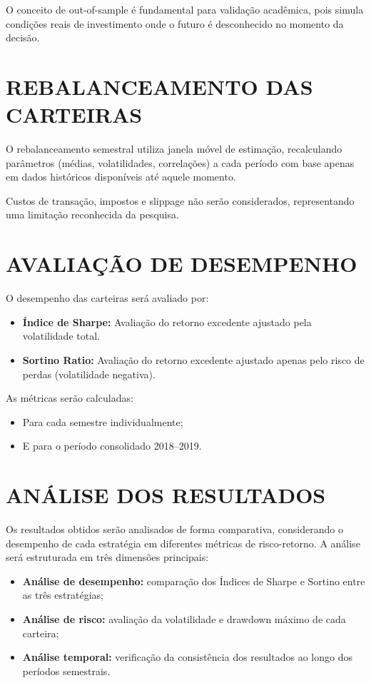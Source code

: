 O conceito de out-of-sample é fundamental para validação acadêmica, pois simula condições reais de investimento onde o futuro é desconhecido no momento da decisão.

\section{REBALANCEAMENTO DAS CARTEIRAS}

O rebalanceamento semestral utiliza janela móvel de estimação, recalculando parâmetros (médias, volatilidades, correlações) a cada período com base apenas em dados históricos disponíveis até aquele momento.

Custos de transação, impostos e slippage não serão considerados, representando uma limitação reconhecida da pesquisa.

\section{AVALIAÇÃO DE DESEMPENHO}

O desempenho das carteiras será avaliado por:

\begin{itemize}
    \item \textbf{Índice de Sharpe:} Avaliação do retorno excedente ajustado pela volatilidade total.
    \item \textbf{Sortino Ratio:} Avaliação do retorno excedente ajustado apenas pelo risco de perdas (volatilidade negativa).
\end{itemize}

As métricas serão calculadas:
\begin{itemize}
    \item Para cada semestre individualmente;
    \item E para o período consolidado 2018--2019.
\end{itemize}

\section{ANÁLISE DOS RESULTADOS}

Os resultados obtidos serão analisados de forma comparativa, considerando o desempenho de cada estratégia em diferentes métricas de risco-retorno. A análise será estruturada em três dimensões principais:

\begin{itemize}
    \item \textbf{Análise de desempenho:} comparação dos Índices de Sharpe e Sortino entre as três estratégias;
    \item \textbf{Análise de risco:} avaliação da volatilidade e drawdown máximo de cada carteira;
    \item \textbf{Análise temporal:} verificação da consistência dos resultados ao longo dos períodos semestrais.
\end{itemize}

